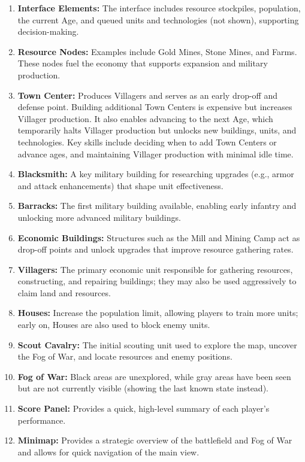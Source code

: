 \begin{enumerate}[leftmargin=*,noitemsep,topsep=0pt]
  \item \textbf{Interface Elements:} The interface includes resource stockpiles, population, the current Age, and queued units and technologies (not shown), supporting decision-making.
  \item \textbf{Resource Nodes:} Examples include Gold Mines, Stone Mines, and Farms. These nodes fuel the economy that supports expansion and military production.
  \item \textbf{Town Center:} Produces Villagers and serves as an early drop-off and defense point. Building additional Town Centers is expensive but increases Villager production. It also enables advancing to the next Age, which temporarily halts Villager production but unlocks new buildings, units, and technologies. Key skills include deciding when to add Town Centers or advance ages, and maintaining Villager production with minimal idle time.
  \item \textbf{Blacksmith:} A key military building for researching upgrades (e.g., armor and attack enhancements) that shape unit effectiveness.
  \item \textbf{Barracks:} The first military building available, enabling early infantry and unlocking more advanced military buildings.
  \item \textbf{Economic Buildings:} Structures such as the Mill and Mining Camp act as drop-off points and unlock upgrades that improve resource gathering rates.
  \item \textbf{Villagers:} The primary economic unit responsible for gathering resources, constructing, and repairing buildings; they may also be used aggressively to claim land and resources.
  \item \textbf{Houses:} Increase the population limit, allowing players to train more units; early on, Houses are also used to block enemy units.
  \item \textbf{Scout Cavalry:} The initial scouting unit used to explore the map, uncover the Fog of War, and locate resources and enemy positions.
  \item \textbf{Fog of War:} Black areas are unexplored, while gray areas have been seen but are not currently visible (showing the last known state instead).
  \item \textbf{Score Panel:} Provides a quick, high-level summary of each player's performance.
  \item \textbf{Minimap:} Provides a strategic overview of the battlefield and Fog of War and allows for quick navigation of the main view.
\end{enumerate}

